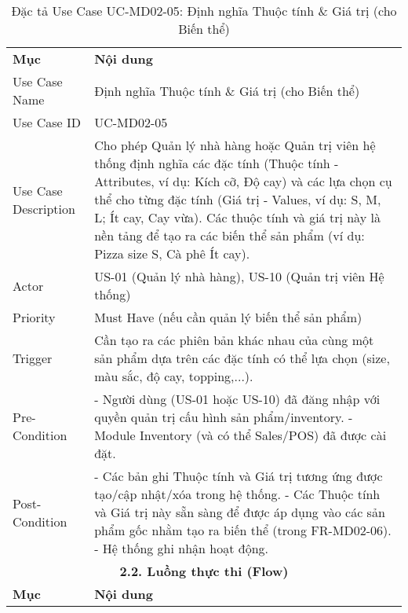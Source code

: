 \begin{longtable}{|m{4cm}|p{11cm}|}
\caption{Đặc tả Use Case UC-MD02-05: Định nghĩa Thuộc tính \& Giá trị (cho Biến thể)} \label{tab:uc_md02_05} \\
\hline

\endhead %

\hline
\endfoot %

\hline
\endlastfoot %
\multicolumn{2}{|c|}{\textbf{2.1. Tóm tắt (Summary)}} \\
\hline
\textbf{Mục} & \textbf{Nội dung} \\
\hline
Use Case Name & Định nghĩa Thuộc tính \& Giá trị (cho Biến thể) \\
\hline
Use Case ID & UC-MD02-05 \\
\hline
Use Case Description & Cho phép Quản lý nhà hàng hoặc Quản trị viên hệ thống định nghĩa các đặc tính (Thuộc tính - Attributes, ví dụ: Kích cỡ, Độ cay) và các lựa chọn cụ thể cho từng đặc tính (Giá trị - Values, ví dụ: S, M, L; Ít cay, Cay vừa). Các thuộc tính và giá trị này là nền tảng để tạo ra các biến thể sản phẩm (ví dụ: Pizza size S, Cà phê Ít cay). \\
\hline
Actor & US-01 (Quản lý nhà hàng), US-10 (Quản trị viên Hệ thống) \\
\hline
Priority & Must Have (nếu cần quản lý biến thể sản phẩm) \\
\hline
Trigger & Cần tạo ra các phiên bản khác nhau của cùng một sản phẩm dựa trên các đặc tính có thể lựa chọn (size, màu sắc, độ cay, topping,...). \\
\hline
Pre-Condition & - Người dùng (US-01 hoặc US-10) đã đăng nhập với quyền quản trị cấu hình sản phẩm/inventory. \newline - Module Inventory (và có thể Sales/POS) đã được cài đặt. \\
\hline
Post-Condition & - Các bản ghi Thuộc tính và Giá trị tương ứng được tạo/cập nhật/xóa trong hệ thống. \newline - Các Thuộc tính và Giá trị này sẵn sàng để được áp dụng vào các sản phẩm gốc nhằm tạo ra biến thể (trong FR-MD02-06). \newline - Hệ thống ghi nhận hoạt động. \\
\hline
\multicolumn{2}{|c|}{\textbf{2.2. Luồng thực thi (Flow)}} \\
\hline
\textbf{Mục} & \textbf{Nội dung} \\
\hline

\end{longtable}

